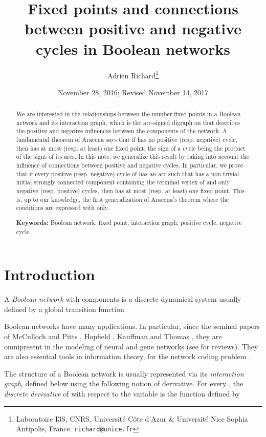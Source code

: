 \documentclass[11pt,a4paper]{article}
\title{Fixed points and connections between positive and negative cycles in Boolean networks}
\author{
Adrien Richard\footnote{Laboratoire I3S, CNRS, Universit\'e C\^ote d'Azur \& Universit\'e Nice Sophia Antipolis, France.
\tt{richard@unice.fr}}
}
\date{November 28, 2016; Revised November 14, 2017}
\begin{document}
\maketitle

\begin{abstract} 
We are interested in the relationships between the number fixed points in a Boolean network  and its interaction graph, which is the arc-signed digraph  on  that describes the positive and negative influences between the components of the network. A fundamental theorem of Aracena says that if  has no positive (resp. negative) cycle, then  has at most (resp. at least) one fixed point; the sign of a cycle being the product of the signs of its arcs. In this note, we generalize this result by taking into account the influence of connections between positive and negative cycles. In particular, we prove that if every positive (resp. negative) cycle of  has an arc  such that  has a non-trivial initial strongly connected component containing the terminal vertex of  and only negative (resp. positive) cycles, then  has at most (resp. at least) one fixed point. This is, up to our knowledge, the first generalization of Aracena's theorem where the conditions are expressed with  only. 




\medskip\noindent
{\bf Keywords:} Boolean network, fixed point, interaction graph, positive cycle, negative cycle. 
\end{abstract}

\section{Introduction}


A {\em Boolean network} with  components is a discrete dynamical system usually defined by a global transition function

Boolean networks have many applications. In particular, since the seminal papers of McCulloch and Pitts \cite{MP43}, Hopfield \cite{H82}, Kauffman \cite{K69,K93} and Thomas \cite{T73,TA90}, they are omnipresent in the modeling of neural and gene networks (see \cite{B08,N15} for reviews). They are also essential tools in information theory, for the network coding problem \cite{ANLY00,GRF16}. 

\medskip
The structure of a Boolean network  is usually represented via its {\em interaction graph}, defined below using the following notion of derivative. For every , the {\em discrete derivative} of  with respect to the variable  is the function  defined by 
\end{document}

